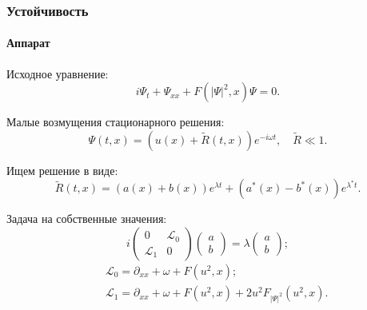 \documentclass{beamer}
\begin{document}
\begin{frame}
	\frametitle{Устойчивость}
	\framesubtitle{Аппарат\footnotemark[4]}
	
	Исходное уравнение:
	\begin{equation}
		i \Psi_t + \Psi_{xx} + F(|\Psi|^2, x) \Psi = 0.
		\label{eq:stability}
	\end{equation}

	Малые возмущения стационарного решения:
	\begin{equation}
		\Psi(t, x) = (u(x) + \widetilde{R}(t, x)) e^{-i \omega t}, \quad \widetilde{R} \ll 1.
		\label{eq:perturbation}
	\end{equation}
	
	Ищем решение в виде:
	\begin{equation}
		\widetilde{R}(t, x) = (a(x) + b(x)) e^{\lambda t} + (a^*(x) - b^*(x)) e^{\lambda^* t}.
		\label{eq:ansatz}
	\end{equation}
	
	Задача на собственные значения:
	\begin{equation}
		i \begin{pmatrix} 0 & \mathcal{L}_0 \\ \mathcal{L}_1 & 0 \end{pmatrix} \begin{pmatrix} a \\ b \end{pmatrix} = \lambda \begin{pmatrix} a \\ b \end{pmatrix};
		\label{eq:eigenvalues}
	\end{equation}
	\begin{eqnarray}
		&& \mathcal{L}_0 = \partial_{xx} + \omega + F(u^2, x); \\
		&& \mathcal{L}_1 = \partial_{xx} + \omega + F(u^2, x) + 2u^2 F_{|\Psi|^2}(u^2, x).
	\end{eqnarray}
	
\end{frame}
\end{document}
